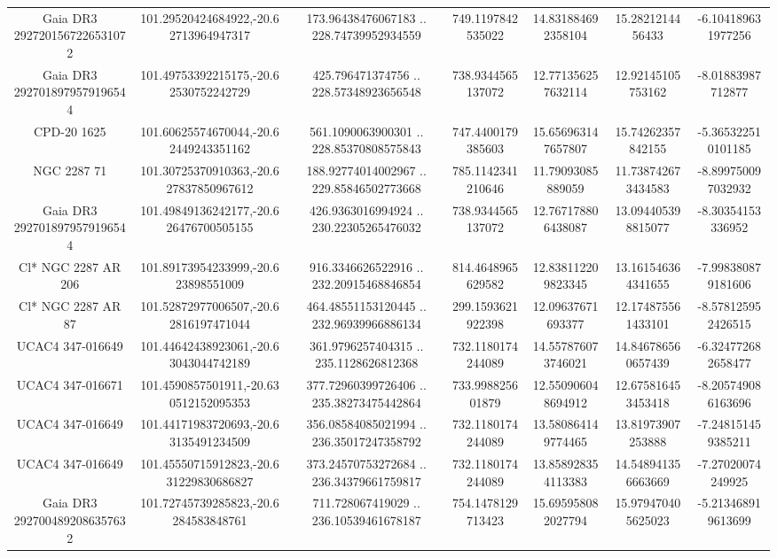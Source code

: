\begin{table}
\begin{tabular}{ccccccc}
Gaia DR3 2927201567226531072 & 101.29520424684922,-20.62713964947317 & 173.96438476067183 .. 228.74739952934559 & 749.1197842535022 & 14.831884692358104 & 15.2821214456433 & -6.104189631977256 \\
Gaia DR3 2927018979579196544 & 101.49753392215175,-20.62530752242729 & 425.796471374756 .. 228.57348923656548 & 738.9344565137072 & 12.771356257632114 & 12.92145105753162 & -8.01883987712877 \\
CPD-20  1625 & 101.60625574670044,-20.62449243351162 & 561.1090063900301 .. 228.85370808575843 & 747.4400179385603 & 15.656963147657807 & 15.74262357842155 & -5.365322510101185 \\
NGC  2287    71 & 101.30725370910363,-20.627837850967612 & 188.92774014002967 .. 229.85846502773668 & 785.1142341210646 & 11.79093085889059 & 11.738742673434583 & -8.899750097032932 \\
Gaia DR3 2927018979579196544 & 101.49849136242177,-20.626476700505155 & 426.9363016994924 .. 230.22305265476032 & 738.9344565137072 & 12.767178806438087 & 13.094405398815077 & -8.30354153336952 \\
Cl* NGC 2287     AR     206 & 101.89173954233999,-20.623898551009 & 916.3346626522916 .. 232.20915468846854 & 814.4648965629582 & 12.838112209823345 & 13.161546364341655 & -7.998380879181606 \\
Cl* NGC 2287     AR      87 & 101.52872977006507,-20.62816197471044 & 464.48551153120445 .. 232.96939966886134 & 299.1593621922398 & 12.09637671693377 & 12.174875561433101 & -8.578125952426515 \\
UCAC4 347-016649 & 101.44642438923061,-20.63043044742189 & 361.9796257404315 .. 235.1128626812368 & 732.1180174244089 & 14.557876073746021 & 14.846786560657439 & -6.324772682658477 \\
UCAC4 347-016671 & 101.4590857501911,-20.630512152095353 & 377.72960399726406 .. 235.38273475442864 & 733.998825601879 & 12.550906048694912 & 12.675816453453418 & -8.205749086163696 \\
UCAC4 347-016649 & 101.44171983720693,-20.63135491234509 & 356.08584085021994 .. 236.35017247358792 & 732.1180174244089 & 13.580864149774465 & 13.81973907253888 & -7.248151459385211 \\
UCAC4 347-016649 & 101.45550715912823,-20.631229830686827 & 373.24570753272684 .. 236.34379661759817 & 732.1180174244089 & 13.858928354113383 & 14.548941356663669 & -7.27020074249925 \\
Gaia DR3 2927004892086357632 & 101.72745739285823,-20.6284583848761 & 711.728067419029 .. 236.10539461678187 & 754.1478129713423 & 15.695958082027794 & 15.979470405625023 & -5.213468919613699 \\

\end{tabular}
\end{table}
